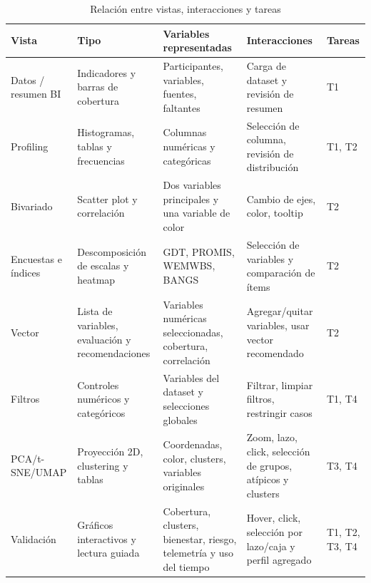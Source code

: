 \documentclass[12pt,a4paper]{article}
\begin{document}
\begin{table}[H]
\centering
\caption{Relaci\'on entre vistas, interacciones y tareas}
\begin{tabularx}{\textwidth}{p{2.8cm} p{2.8cm} p{3.2cm} p{3.1cm} X}
\toprule
\textbf{Vista} & \textbf{Tipo} & \textbf{Variables representadas} & \textbf{Interacciones} & \textbf{Tareas} \\
\midrule
Datos / resumen BI & Indicadores y barras de cobertura & Participantes, variables, fuentes, faltantes & Carga de dataset y revisi\'on de resumen & T1 \\
Profiling & Histogramas, tablas y frecuencias & Columnas num\'ericas y categ\'oricas & Selecci\'on de columna, revisi\'on de distribuci\'on & T1, T2 \\
Bivariado & Scatter plot y correlaci\'on & Dos variables principales y una variable de color & Cambio de ejes, color, tooltip & T2 \\
Encuestas e \'indices & Descomposici\'on de escalas y heatmap & GDT, PROMIS, WEMWBS, BANGS & Selecci\'on de variables y comparaci\'on de \'items & T2 \\
Vector & Lista de variables, evaluaci\'on y recomendaciones & Variables num\'ericas seleccionadas, cobertura, correlaci\'on & Agregar/quitar variables, usar vector recomendado & T2 \\
Filtros & Controles num\'ericos y categ\'oricos & Variables del dataset y selecciones globales & Filtrar, limpiar filtros, restringir casos & T1, T4 \\
PCA/t-SNE/UMAP & Proyecci\'on 2D, clustering y tablas & Coordenadas, color, clusters, variables originales & Zoom, lazo, click, selecci\'on de grupos, at\'ipicos y clusters & T3, T4 \\
Validaci\'on & Gr\'aficos interactivos y lectura guiada & Cobertura, clusters, bienestar, riesgo, telemetr\'ia y uso del tiempo & Hover, click, selecci\'on por lazo/caja y perfil agregado & T1, T2, T3, T4 \\
\bottomrule
\end{tabularx}
\end{table}
\end{document}
